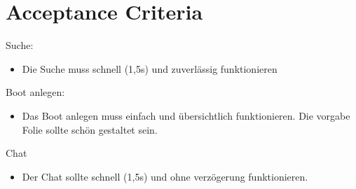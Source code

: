 \documentclass[12pt]{article}
\theoremstyle{definition}
\begin{document}
\pagebreak
\section{Acceptance Criteria}
Suche:
\begin{itemize}
	\item Die Suche muss schnell (1,5s) und zuverlässig funktionieren
\end{itemize}
Boot anlegen:
\begin{itemize}
	\item Das Boot anlegen muss einfach und übersichtlich funktionieren. Die vorgabe Folie sollte schön gestaltet sein.
\end{itemize}
Chat
\begin{itemize}
	\item Der Chat sollte schnell (1,5s) und ohne verzögerung funktionieren.
\end{itemize}
\end{document}

